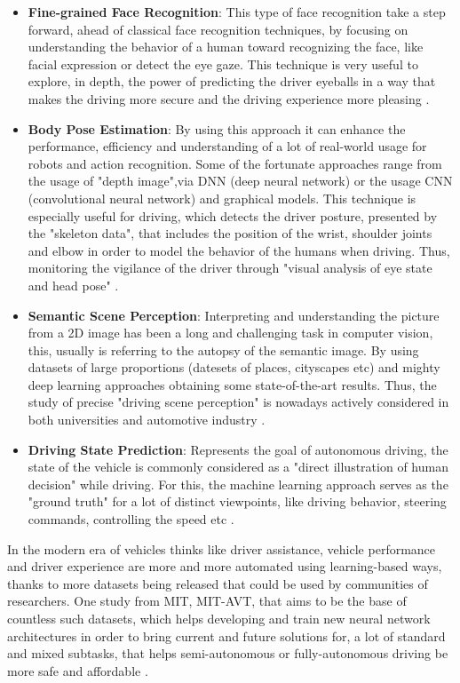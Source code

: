 \begin{itemize}
    \item \textbf{Fine-grained Face Recognition}: This type of face recognition take a step forward, ahead of classical face recognition techniques, by focusing on understanding the behavior of a human toward recognizing the face, like facial expression or detect the eye gaze. This technique is very useful to explore, in depth, the power of predicting the driver eyeballs in a way that makes the driving more secure and the driving experience more pleasing \cite{MIT, Frust, DetectEmotional}.  
    
    \item \textbf{Body Pose Estimation}: By using this approach it can enhance the performance, efficiency and understanding of a lot of real-world usage for robots and action recognition. Some of the fortunate approaches range from the usage of "depth image",via DNN (deep neural network) or the usage CNN (convolutional neural network) and graphical models. This technique is especially useful for driving, which detects the driver posture, presented by the "skeleton data", that includes the position of the wrist, shoulder joints and elbow in order to model the behavior of the humans when driving. Thus, monitoring the vigilance of the driver through "visual analysis of eye state and head pose" \cite{MIT}.
    
    \item \textbf{Semantic Scene Perception}: Interpreting and understanding the picture from a 2D image has been a long and challenging task in computer vision, this, usually is referring to the autopsy of the semantic image. By using datasets of  large proportions (datesets of places, cityscapes etc) and mighty deep learning approaches obtaining some state-of-the-art results. Thus, the study of precise "driving scene perception" is nowadays actively considered in both universities and automotive industry \cite{MIT, EndTOEnd}.
    
    \item \textbf{Driving State Prediction}: Represents the goal of autonomous driving, the state of the vehicle is commonly considered as a "direct illustration of human decision" while driving. For this, the machine learning approach serves as the "ground truth" for a lot of distinct viewpoints, like driving behavior, steering commands, controlling the speed etc \cite{MIT, EndTOEnd}.
\end{itemize}

In the modern era of vehicles thinks like driver assistance, vehicle performance and driver experience are more and more automated using learning-based ways, thanks to more datasets being released that could be used by communities of researchers. One study from MIT, MIT-AVT, that aims to be the base of countless such datasets, which helps developing and train new neural network architectures in order to bring current and future solutions for, a lot of standard and 
mixed subtasks, that helps semi-autonomous or fully-autonomous driving be more safe and affordable \cite{MIT}.